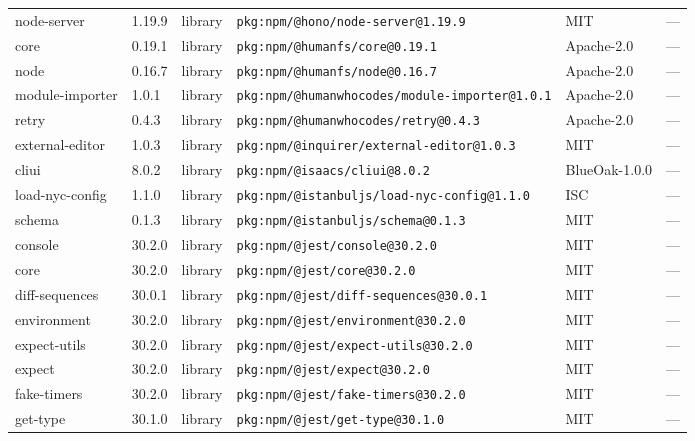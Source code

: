\documentclass[11pt,a4paper]{article}
\begin{document}
\begin{longtable}{|p{4cm}|p{2cm}|p{1.6cm}|p{5cm}|p{1.5cm}|p{3.5cm}|}
\raggedright node-server & 1.19.9 & library & \small\texttt{pkg:npm/@hono/node-server@1.19.9} & MIT & \small — \\
\raggedright core & 0.19.1 & library & \small\texttt{pkg:npm/@humanfs/core@0.19.1} & Apache-2.0 & \small — \\
\raggedright node & 0.16.7 & library & \small\texttt{pkg:npm/@humanfs/node@0.16.7} & Apache-2.0 & \small — \\
\raggedright module-importer & 1.0.1 & library & \small\texttt{pkg:npm/@humanwhocodes/module-importer@1.0.1} & Apache-2.0 & \small — \\
\raggedright retry & 0.4.3 & library & \small\texttt{pkg:npm/@humanwhocodes/retry@0.4.3} & Apache-2.0 & \small — \\
\raggedright external-editor & 1.0.3 & library & \small\texttt{pkg:npm/@inquirer/external-editor@1.0.3} & MIT & \small — \\
\raggedright cliui & 8.0.2 & library & \small\texttt{pkg:npm/@isaacs/cliui@8.0.2} & BlueOak-1.0.0 & \small — \\
\raggedright load-nyc-config & 1.1.0 & library & \small\texttt{pkg:npm/@istanbuljs/load-nyc-config@1.1.0} & ISC & \small — \\
\raggedright schema & 0.1.3 & library & \small\texttt{pkg:npm/@istanbuljs/schema@0.1.3} & MIT & \small — \\
\raggedright console & 30.2.0 & library & \small\texttt{pkg:npm/@jest/console@30.2.0} & MIT & \small — \\
\raggedright core & 30.2.0 & library & \small\texttt{pkg:npm/@jest/core@30.2.0} & MIT & \small — \\
\raggedright diff-sequences & 30.0.1 & library & \small\texttt{pkg:npm/@jest/diff-sequences@30.0.1} & MIT & \small — \\
\raggedright environment & 30.2.0 & library & \small\texttt{pkg:npm/@jest/environment@30.2.0} & MIT & \small — \\
\raggedright expect-utils & 30.2.0 & library & \small\texttt{pkg:npm/@jest/expect-utils@30.2.0} & MIT & \small — \\
\raggedright expect & 30.2.0 & library & \small\texttt{pkg:npm/@jest/expect@30.2.0} & MIT & \small — \\
\raggedright fake-timers & 30.2.0 & library & \small\texttt{pkg:npm/@jest/fake-timers@30.2.0} & MIT & \small — \\
\raggedright get-type & 30.1.0 & library & \small\texttt{pkg:npm/@jest/get-type@30.1.0} & MIT & \small — \\

\end{longtable}
\end{document}
